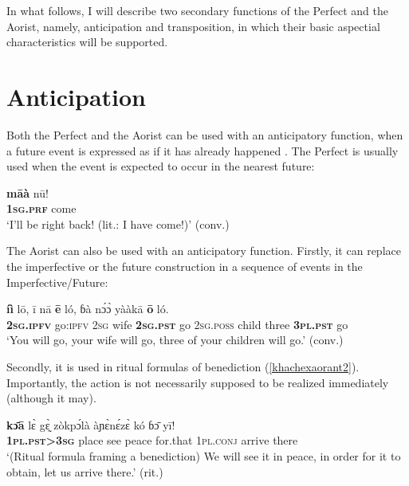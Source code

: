 \documentclass[output=paper]{LSP/langsci}
\begin{document}
In what follows, I will describe two secondary functions of the Perfect and the Aorist, namely, anticipation and transposition, in which their basic aspectial characteristics will be supported.

\section{Anticipation}
\label{khachs4}
Both the Perfect and the Aorist can be used with an anticipatory function, when a future event is expressed as if it has already happened \citep[cf.][224]{khachhanks1990}. The Perfect is usually used when the event is expected to occur in the nearest future:

\begin{exe} \ex
\gll	\textbf{māà}	nū!\\
	\textbf{1\textsc{sg}.\textsc{prf}}	come\\
\glt ‘I’ll be right back! (lit.: I have come!)’ (conv.)
\end{exe}

The Aorist can also be used with an anticipatory function. Firstly, it can replace the imperfective or the future construction in a sequence of events in the Imperfective/Future:

\begin{exe} \ex
\gll	\textbf{íì}	lō,	ī	nā	\textbf{ē}	ló,	ɓà	nɔ́ɔ̀	yààkā	\textbf{ō}	ló.\\
	\textbf{2\textsc{sg}.\textsc{ipfv}}	go:\textsc{ipfv}	2\textsc{sg}	wife	\textbf{2\textsc{sg}.\textsc{pst}}	go	2\textsc{sg}.\textsc{poss}	child	three	\textbf{3\textsc{pl}.\textsc{pst}}	go\\
\glt ‘You will go, your wife will go, three of your children will go.’ (conv.)
\end{exe}

Secondly, it is used in ritual formulas of benediction (\ref{khachexaorant2}). Importantly, the action is not necessarily supposed to be realized immediately (although it may).

\begin{exe} \ex
\label{khachexaorant2}
\gll 	\textbf{kɔ̄ā}	lɛ̀	gɛ̰̀	zòkpɔ́là	àɲɛ̀nɛ́zɛ̀	kó	ɓɔ̄	yī!\\
	\textbf{1\textsc{pl}.\textsc{pst}>3\textsc{sg}}	place	see	peace	for.that	1\textsc{pl}.\textsc{conj}	arrive	there\\
\glt ‘(Ritual formula framing a benediction) We will see it in peace, in order for it to obtain, let us arrive there.’ (rit.)
\end{exe}
\end{document}
